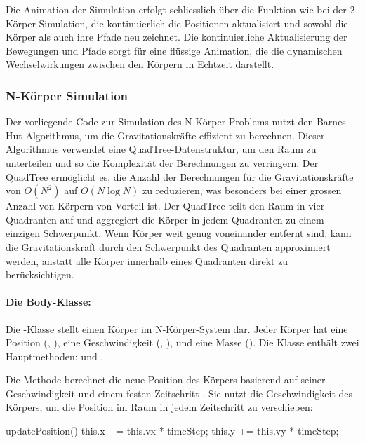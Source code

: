 \documentclass[a4paper,12pt,twoside]{article}
\begin{document}
Die Animation der Simulation erfolgt schliesslich über die Funktion 
 wie bei der 2-Körper Simulation, die kontinuierlich 
die Positionen aktualisiert und sowohl die Körper als auch ihre Pfade neu zeichnet. 
Die kontinuierliche Aktualisierung der Bewegungen und Pfade sorgt für eine flüssige 
Animation, die die dynamischen Wechselwirkungen zwischen den Körpern in Echtzeit 
darstellt.

\subsubsection{N-Körper Simulation}
Der vorliegende Code zur Simulation des N-Körper-Problems nutzt den Barnes-Hut-Algorithmus, 
um die Gravitationskräfte effizient zu berechnen. Dieser Algorithmus verwendet eine 
QuadTree-Datenstruktur, um den Raum zu unterteilen und so die Komplexität der 
Berechnungen zu verringern. Der QuadTree ermöglicht es, die Anzahl der Berechnungen 
für die Gravitationskräfte von \(O(N^2)\) auf \(O(N \log N)\) zu reduzieren, 
was besonders bei einer grossen Anzahl von Körpern von Vorteil ist. 
Der QuadTree teilt den Raum in vier Quadranten auf und aggregiert die Körper 
in jedem Quadranten zu einem einzigen Schwerpunkt. Wenn Körper weit genug voneinander 
entfernt sind, kann die Gravitationskraft durch den Schwerpunkt des Quadranten 
approximiert werden, anstatt alle Körper innerhalb eines Quadranten direkt zu 
berücksichtigen.

\paragraph{Die Body-Klasse:}
Die -Klasse stellt einen Körper im N-Körper-System dar. 
Jeder Körper hat eine Position (, ), 
eine Geschwindigkeit (, ), und eine 
Masse (). Die Klasse enthält zwei Hauptmethoden: 
 und .

Die Methode  berechnet die neue Position des 
Körpers basierend auf seiner Geschwindigkeit und einem festen Zeitschritt 
. Sie nutzt die Geschwindigkeit des Körpers, 
um die Position im Raum in jedem Zeitschritt zu verschieben:

\begin{javascript}
updatePosition() {
    this.x += this.vx * timeStep;
    this.y += this.vy * timeStep;
}
\end{javascript}
\end{document}

